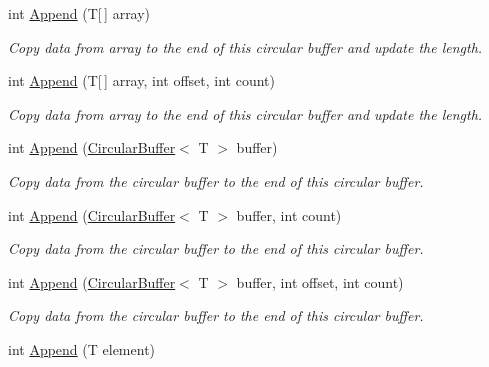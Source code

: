 \begin{DoxyCompactItemize}
int \mbox{\hyperlink{class_r_j_c_p_1_1_datastructures_1_1_circular_buffer_a03764d55e9b6fd78b58a3bbf12977edb}{Append}} (T\mbox{[}$\,$\mbox{]} array)
\begin{DoxyCompactList}\small\item\em Copy data from array to the end of this circular buffer and update the length. \end{DoxyCompactList}\item 
int \mbox{\hyperlink{class_r_j_c_p_1_1_datastructures_1_1_circular_buffer_a6e5d04b3cfaae9f41011d8c45097ef55}{Append}} (T\mbox{[}$\,$\mbox{]} array, int offset, int count)
\begin{DoxyCompactList}\small\item\em Copy data from array to the end of this circular buffer and update the length. \end{DoxyCompactList}\item 
int \mbox{\hyperlink{class_r_j_c_p_1_1_datastructures_1_1_circular_buffer_ae9728a92333805eaaaae6945078a4ad4}{Append}} (\mbox{\hyperlink{class_r_j_c_p_1_1_datastructures_1_1_circular_buffer}{Circular\+Buffer}}$<$ T $>$ buffer)
\begin{DoxyCompactList}\small\item\em Copy data from the circular buffer to the end of this circular buffer. \end{DoxyCompactList}\item 
int \mbox{\hyperlink{class_r_j_c_p_1_1_datastructures_1_1_circular_buffer_a92a93e7c9c188cdf8bce6f5c1d3f691b}{Append}} (\mbox{\hyperlink{class_r_j_c_p_1_1_datastructures_1_1_circular_buffer}{Circular\+Buffer}}$<$ T $>$ buffer, int count)
\begin{DoxyCompactList}\small\item\em Copy data from the circular buffer to the end of this circular buffer. \end{DoxyCompactList}\item 
int \mbox{\hyperlink{class_r_j_c_p_1_1_datastructures_1_1_circular_buffer_ad2b00c844d2d762e349b5cd0be4a6b9d}{Append}} (\mbox{\hyperlink{class_r_j_c_p_1_1_datastructures_1_1_circular_buffer}{Circular\+Buffer}}$<$ T $>$ buffer, int offset, int count)
\begin{DoxyCompactList}\small\item\em Copy data from the circular buffer to the end of this circular buffer. \end{DoxyCompactList}\item 
int \mbox{\hyperlink{class_r_j_c_p_1_1_datastructures_1_1_circular_buffer_a48e62ce9129f4849ec575ad7975c24c2}{Append}} (T element)

\end{DoxyCompactItemize}
